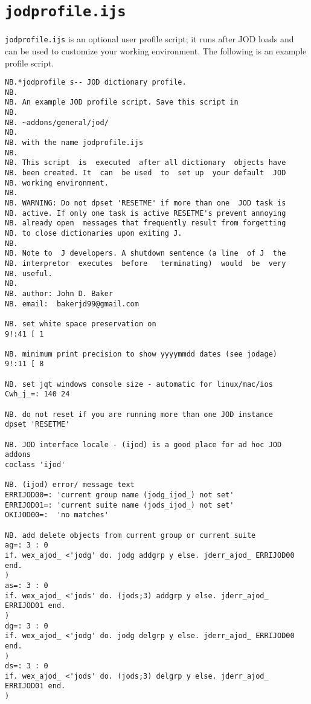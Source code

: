    \newpage
   \section{\texttt{jodprofile.ijs}}\label{ap:jodprofile}
   
\verb|jodprofile.ijs| is an optional user profile script; it runs after
JOD loads and can be used to customize your working environment.  The following is an example
profile script. 


\begin{lstlisting}[frame=single,framerule=0pt,basicstyle=\ttfamily\footnotesize]
NB.*jodprofile s-- JOD dictionary profile.
NB.
NB. An example JOD profile script. Save this script in
NB.
NB. ~addons/general/jod/
NB.
NB. with the name jodprofile.ijs
NB.
NB. This script  is  executed  after all dictionary  objects have
NB. been created. It  can  be used  to  set up  your default  JOD
NB. working environment.
NB.
NB. WARNING: Do not dpset 'RESETME' if more than one  JOD task is
NB. active. If only one task is active RESETME's prevent annoying
NB. already open  messages that frequently result from forgetting
NB. to close dictionaries upon exiting J.
NB.
NB. Note to  J developers. A shutdown sentence (a line  of J  the
NB. interpretor  executes  before   terminating)  would  be  very
NB. useful.
NB.
NB. author: John D. Baker
NB. email:  bakerjd99@gmail.com

NB. set white space preservation on
9!:41 [ 1

NB. minimum print precision to show yyyymmdd dates (see jodage)
9!:11 [ 8

NB. set jqt windows console size - automatic for linux/mac/ios
Cwh_j_=: 140 24

NB. do not reset if you are running more than one JOD instance
dpset 'RESETME'

NB. JOD interface locale - (ijod) is a good place for ad hoc JOD addons 
coclass 'ijod'

NB. (ijod) error/ message text
ERRIJOD00=: 'current group name (jodg_ijod_) not set'
ERRIJOD01=: 'current suite name (jods_ijod_) not set'
OKIJOD00=:  'no matches'

NB. add delete objects from current group or current suite
ag=: 3 : 0
if. wex_ajod_ <'jodg' do. jodg addgrp y else. jderr_ajod_ ERRIJOD00 end.
)
as=: 3 : 0
if. wex_ajod_ <'jods' do. (jods;3) addgrp y else. jderr_ajod_ ERRIJOD01 end.
)
dg=: 3 : 0
if. wex_ajod_ <'jodg' do. jodg delgrp y else. jderr_ajod_ ERRIJOD00 end.
)
ds=: 3 : 0
if. wex_ajod_ <'jods' do. (jods;3) delgrp y else. jderr_ajod_ ERRIJOD01 end. 
)
   

\end{lstlisting}
